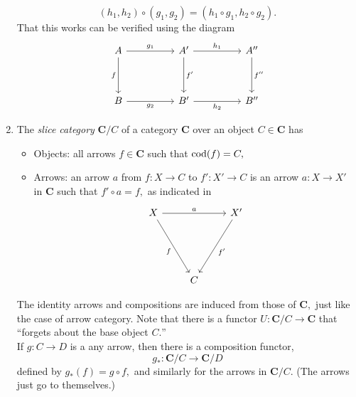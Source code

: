 \begin{enumerate}
	\begin{equation*} 
		(h_1, h_2)\circ (g_1, g_2) = (h_1\circ g_1, h_2\circ g_2).
	\end{equation*}
	That this works can be verified using the diagram
	\begin{equation*} 
		\begin{tikzcd}
		A \arrow[dd, "f"'] \arrow[rr, "g_1"] &  & A' \arrow[dd, "f'"] \arrow[rr, "h_1"] &  & A'' \arrow[dd, "f''"] \\
		                                     &  &                                       &  &                       \\
		B \arrow[rr, "g_2"']                 &  & B' \arrow[rr, "h_2"']                 &  & B''                  
		\end{tikzcd}
	\end{equation*}
	\item The \emph{slice category} $\mathbf{C}/C$ of a category $\mathbf{C}$ over an object $C \in \mathbf{C}$ has
	\begin{itemize}
		\item Objects: all arrows $f \in \mathbf{C}$ such that $\operatorname{cod}(f) = C,$
		\item Arrows: an arrow $a$ from $f:X\to C$ to $f':X' \to C$ is an arrow $a: X\to X'$ in $\mathbf{C}$ such that $f'\circ a = f,$ as indicated in
		\begin{equation*} 
			\begin{tikzcd}
			X \arrow[rddd, "f"'] \arrow[rr, "a"] &     & X' \arrow[lddd, "f'"] \\
			                                       &     &                   \\
			                                       &     &                   \\
			                                       &  C  &                      
			\end{tikzcd}
		\end{equation*}
	\end{itemize}
	The identity arrows and compositions are induced from those of $\mathbf{C},$ just like the case of arrow category. Note that there is a functor $U:\mathbf{C}/C \to \mathbf{C}$ that ``forgets about the base object $C.$''\\
	If $g:C\to D$ is a any arrow, then there is a composition functor,
	\begin{equation*} 
		g_*:\mathbf{C}/C \to \mathbf{C}/D
	\end{equation*}
	defined by $g_*(f) = g\circ f,$ and similarly for the arrows in $\mathbf{C}/C.$ (The arrows just go to themselves.)\\

\end{enumerate}
